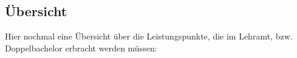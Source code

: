 %
%
%
%
%


\subsection{Übersicht} %
Hier nochmal eine Übersicht über die Leistungspunkte, die im Lehramt, bzw. Doppelbachelor erbracht werden müssen:

